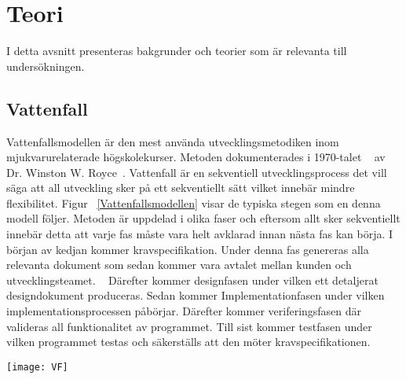 \section{Teori} \label{sec:Lieth_Wahid-theory}
I detta avsnitt presenteras bakgrunder och teorier som är relevanta till undersökningen. 
\subsection{Vattenfall}
Vattenfallsmodellen är den mest använda utvecklingsmetodiken inom mjukvarurelaterade högskolekurser. Metoden dokumenterades  i 1970-talet  ~\cite{WaterfalM} av Dr. Winston W. Royce~\cite{managing}. Vattenfall är en sekventiell utvecklingsprocess det vill säga att all utveckling sker på ett sekventiellt sätt vilket innebär mindre flexibilitet. Figur ~\ref{Vattenfallsmodellen} visar de typiska 
stegen som en denna modell följer. Metoden är uppdelad i olika faser och eftersom allt sker sekventiellt innebär detta att varje fas måste vara helt avklarad innan nästa fas kan börja.  I början av kedjan kommer kravspecifikation. Under denna fas genereras alla relevanta dokument som sedan kommer vara avtalet mellan kunden och utvecklingsteamet. ~\cite{GameDesign} Därefter kommer designfasen under vilken ett detaljerat designdokument produceras. Sedan kommer Implementationfasen under vilken implementationsprocessen  påbörjar. Därefter kommer veriferingsfasen där valideras all funktionalitet  av programmet. Till sist kommer testfasen under vilken programmet testas och säkerställs  att den möter kravspecifikationen.
\begin{figure*}[h]
	\centering
	\texttt{[image: VF]}
	\caption[Vattenfallsmodellen]{Vattenfallsmodellen~\cite{theWaterFall}}
	\label{Vattenfallsmodellen}
\end{figure*}
